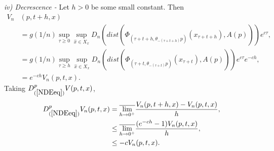 \begin{prf}
  {\em iv) Decrescence -} Let $h > 0$ be some small constant.  Then
  \begin{align*}
  V_n&(p, t + h, x) \\
  &= g(1/n) \sup_{\tau \geq 0} \sup_{\hat{x} \in X_x}
        D_n(dist(\Phi_{(\tau+t+h, \theta_{-(\tau+t+h)} p)}(x_{\tau + t + h}),
        A(p))) e^{c\tau}, \\
  &= g(1/n) \sup_{\tau \geq h} \sup_{\hat{x} \in X_x} D_n(dist(\Phi_{(\tau+t,
        \theta_{-(\tau+t)} p)}(x_{\tau + t}), A(p))) e^{c\tau} e^{-ch}, \\
  &= e^{-ch} V_n(p, t, x).
  \end{align*}
  Taking $D^{p}_{(\ref{NDEeq})}V(p, t, x)$,
  \begin{align*}
  D^{p}_{(\ref{NDEeq})}V_n(p, t, x) &= \overline{\lim_{h \to 0^+}} \frac{V_n(
     p, t+h, x ) - V_n(p, t, x)}{h}, \\
  &\leq \overline{\lim_{h \to 0^+}} \frac{(e^{-ch} - 1) V_n(p, t, x)}{h}, \\
  &\leq - c V_n(p, t, x).
  \end{align*}


\end{prf}
